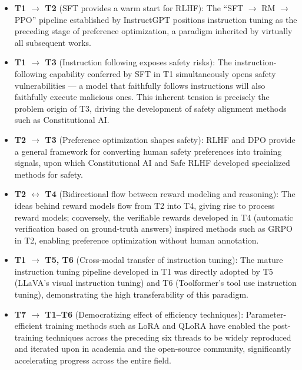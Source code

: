 \begin{itemize}[leftmargin=2em]
  \item \textbf{T1 $\rightarrow$ T2} (SFT provides a warm start for RLHF):
    The ``SFT $\rightarrow$ RM $\rightarrow$ PPO'' pipeline established by InstructGPT
    positions instruction tuning as the preceding stage of preference optimization,
    a paradigm inherited by virtually all subsequent works.

  \item \textbf{T1 $\rightarrow$ T3} (Instruction following exposes safety risks):
    The instruction-following capability conferred by SFT in T1 simultaneously opens safety vulnerabilities ---
    a model that faithfully follows instructions will also faithfully execute malicious ones.
    This inherent tension is precisely the problem origin of T3,
    driving the development of safety alignment methods such as Constitutional AI.

  \item \textbf{T2 $\rightarrow$ T3} (Preference optimization shapes safety):
    RLHF and DPO provide a general framework for converting human safety preferences into training signals,
    upon which Constitutional AI and Safe RLHF developed specialized methods for safety.

  \item \textbf{T2 $\leftrightarrow$ T4} (Bidirectional flow between reward modeling and reasoning):
    The ideas behind reward models flow from T2 into T4, giving rise to process reward models;
    conversely, the verifiable rewards developed in T4 (automatic verification based on ground-truth answers)
    inspired methods such as GRPO in T2, enabling preference optimization without human annotation.

  \item \textbf{T1 $\rightarrow$ T5, T6} (Cross-modal transfer of instruction tuning):
    The mature instruction tuning pipeline developed in T1 was directly adopted by T5 (LLaVA's visual instruction tuning)
    and T6 (Toolformer's tool use instruction tuning),
    demonstrating the high transferability of this paradigm.

  \item \textbf{T7 $\rightarrow$ T1--T6} (Democratizing effect of efficiency techniques):
    Parameter-efficient training methods such as LoRA and QLoRA have enabled the post-training techniques
    across the preceding six threads to be widely reproduced and iterated upon in academia and the open-source community,
    significantly accelerating progress across the entire field.


\end{itemize}
